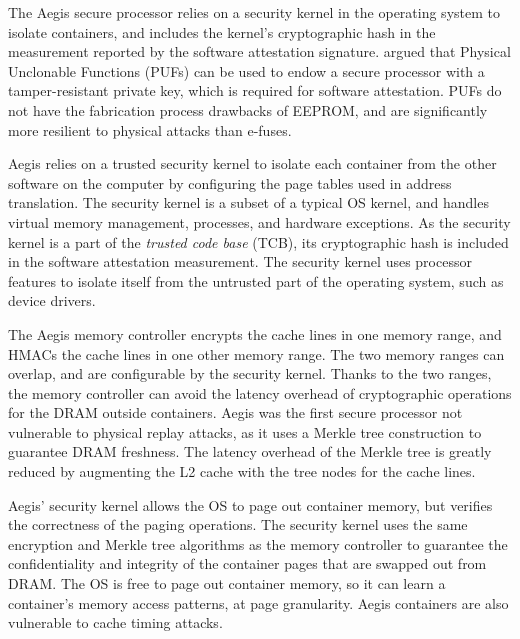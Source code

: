 \label{sec:sgx_related_aegis}

The Aegis secure processor \cite{suh2003aegis} relies on a security kernel in the operating system to isolate containers, and includes the kernel's cryptographic hash in the measurement reported by the software attestation signature.  \cite{aegis_impl} argued that
Physical Unclonable Functions (PUFs) \cite{gassend2002puf} can be used to
endow a secure processor with a tamper-resistant private key, which is required
for software attestation. PUFs do not have the fabrication process drawbacks of
EEPROM, and are significantly more resilient to physical attacks than e-fuses.

Aegis relies on a trusted security kernel to isolate each container from the
other software on the computer by configuring the page tables used in address
translation. The security kernel is a subset of a typical OS kernel, and
handles virtual memory management, processes, and hardware exceptions. As the
security kernel is a part of the \textit{trusted code base} (TCB), its
cryptographic hash is included in the software attestation measurement. The
security kernel uses processor features to isolate itself from the untrusted
part of the operating system, such as device drivers.

The Aegis memory controller encrypts the cache lines in one memory range, and
HMACs the cache lines in one other memory range. The two memory ranges can
overlap, and are configurable by the security kernel. Thanks to the two ranges,
the memory controller can avoid the latency overhead of cryptographic
operations for the DRAM outside containers. Aegis was the first secure processor not vulnerable to physical
replay attacks, as it uses a Merkle tree construction \cite{gassend2003merkle}
to guarantee DRAM freshness. The latency overhead of the Merkle tree is greatly
reduced by augmenting the L2 cache with the tree nodes for the cache lines.

Aegis' security kernel allows the OS to page out container memory, but verifies
the correctness of the paging operations. The security kernel uses the same
encryption and Merkle tree algorithms as the memory controller to guarantee the
confidentiality and integrity of the container pages that are swapped out from
DRAM. The OS is free to page out container memory, so it can learn a
container's memory access patterns, at page granularity. Aegis containers are
also vulnerable to cache timing attacks.

